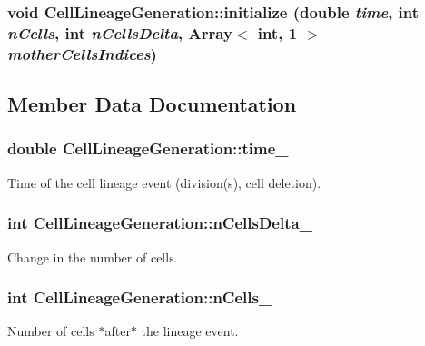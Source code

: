 \subsubsection{\setlength{\rightskip}{0pt plus 5cm}void CellLineageGeneration::initialize (double {\em time}, \/  int {\em nCells}, \/  int {\em nCellsDelta}, \/  Array$<$ int, 1 $>$ {\em motherCellsIndices})}\label{classCellLineageGeneration_8ab621b6c89986fe9a9dced36322804e}




\subsection{Member Data Documentation}
\subsubsection{\setlength{\rightskip}{0pt plus 5cm}double {\bf CellLineageGeneration::time\_\-}}\label{classCellLineageGeneration_49b7013584bc82fd66cc1e3f9e768c71}


Time of the cell lineage event (division(s), cell deletion). 

\subsubsection{\setlength{\rightskip}{0pt plus 5cm}int {\bf CellLineageGeneration::nCellsDelta\_\-}}\label{classCellLineageGeneration_046245349fd814cd7b5fc57d2a9d3fff}


Change in the number of cells. 

\subsubsection{\setlength{\rightskip}{0pt plus 5cm}int {\bf CellLineageGeneration::nCells\_\-}}\label{classCellLineageGeneration_5ba370d3f6492d43ceeb2f73e7a2c47a}


Number of cells $\ast$after$\ast$ the lineage event. 

